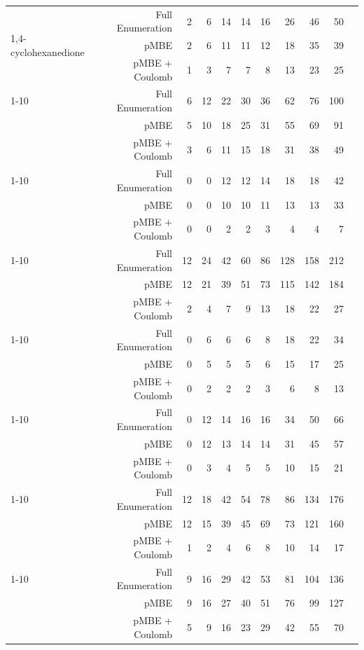 \begin{longtable}{lrrrrrrrrrr}
\multirow[c]{3}{*}{1,4-cyclohexanedione} & Full Enumeration & 2 & 6 & 14 & 14 & 16 & 26 & 46 & 50 \\
 & pMBE & 2 & 6 & 11 & 11 & 12 & 18 & 35 & 39 \\
 & pMBE + Coulomb & 1 & 3 & 7 & 7 & 8 & 13 & 23 & 25 \\
\cline{1-10}
\multirow[c]{3}{*}{Acetic Acid} & Full Enumeration & 6 & 12 & 22 & 30 & 36 & 62 & 76 & 100 \\
 & pMBE & 5 & 10 & 18 & 25 & 31 & 55 & 69 & 91 \\
 & pMBE + Coulomb & 3 & 6 & 11 & 15 & 18 & 31 & 38 & 49 \\
\cline{1-10}
\multirow[c]{3}{*}{Adamantane} & Full Enumeration & 0 & 0 & 12 & 12 & 14 & 18 & 18 & 42 \\
 & pMBE & 0 & 0 & 10 & 10 & 11 & 13 & 13 & 33 \\
 & pMBE + Coulomb & 0 & 0 & 2 & 2 & 3 & 4 & 4 & 7 \\
\cline{1-10}
\multirow[c]{3}{*}{Ammonia} & Full Enumeration & 12 & 24 & 42 & 60 & 86 & 128 & 158 & 212 \\
 & pMBE & 12 & 21 & 39 & 51 & 73 & 115 & 142 & 184 \\
 & pMBE + Coulomb & 2 & 4 & 7 & 9 & 13 & 18 & 22 & 27 \\
\cline{1-10}
\multirow[c]{3}{*}{Anthracene} & Full Enumeration & 0 & 6 & 6 & 6 & 8 & 18 & 22 & 34 \\
 & pMBE & 0 & 5 & 5 & 5 & 6 & 15 & 17 & 25 \\
 & pMBE + Coulomb & 0 & 2 & 2 & 2 & 3 & 6 & 8 & 13 \\
\cline{1-10}
\multirow[c]{3}{*}{Benzene} & Full Enumeration & 0 & 12 & 14 & 16 & 16 & 34 & 50 & 66 \\
 & pMBE & 0 & 12 & 13 & 14 & 14 & 31 & 45 & 57 \\
 & pMBE + Coulomb & 0 & 3 & 4 & 5 & 5 & 10 & 15 & 21 \\
\cline{1-10}
\multirow[c]{3}{*}{CO$_2$} & Full Enumeration & 12 & 18 & 42 & 54 & 78 & 86 & 134 & 176 \\
 & pMBE & 12 & 15 & 39 & 45 & 69 & 73 & 121 & 160 \\
 & pMBE + Coulomb & 1 & 2 & 4 & 6 & 8 & 10 & 14 & 17 \\
\cline{1-10}
\multirow[c]{3}{*}{Cyanamide} & Full Enumeration & 9 & 16 & 29 & 42 & 53 & 81 & 104 & 136 \\
 & pMBE & 9 & 16 & 27 & 40 & 51 & 76 & 99 & 127 \\
 & pMBE + Coulomb & 5 & 9 & 16 & 23 & 29 & 42 & 55 & 70 \\

\end{longtable}
